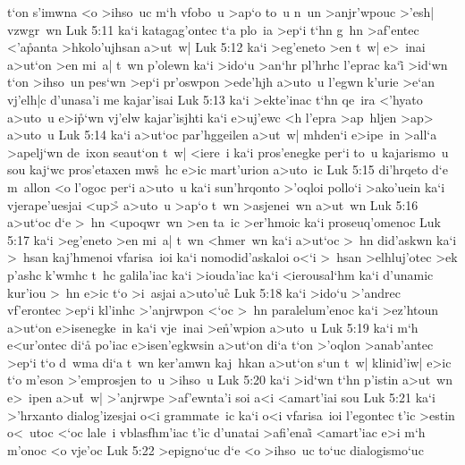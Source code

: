 t`on
s'imwna
<o
>ihso~uc
m`h
vfobo~u
>ap`o
to~u
n~un
>anjr'wpouc
>'esh|
vzwgr~wn\bibvsend
\vs Luk 5:11
ka`i
katagag'ontec
t`a
plo~ia
>ep`i
t`hn
g~hn
>af'entec
<'a\r{p}anta
>hkolo'ujhsan
a>ut~w|\bibvsend
\vs Luk 5:12
ka`i
>eg'eneto
>en
t~w|
e>~inai
a>ut`on
>en
mi~a|
t~wn
p'olewn
ka`i
>ido`u
>an`hr
pl'hrhc
l'eprac
ka`i\r{}
>id`wn
t`on
>ihso~un
pes`wn
>ep`i
pr'oswpon
>ede'hjh
a>uto~u
l'egwn
k'urie
>e`an
vj'elh|c
d'unasa'i
me
kajar'isai\bibvsend
\vs Luk 5:13
ka`i
>ekte'inac
t`hn
qe~ira
<'hyato
a>uto~u
e>i\r{p}`wn
vj'elw
kajar'isjhti
ka`i
e>uj'ewc
<h
l'epra
>ap~hljen
>ap>
a>uto~u\bibvsend
\vs Luk 5:14
ka`i
a>ut`oc
par'hggeilen
a>ut~w|
mhden`i
e>ipe~in
>all`a
>apelj`wn
de~ixon
seaut`on
t~w|
<iere~i
ka`i
pros'enegke
per`i
to~u
kajarismo~u
sou
kaj`wc
pros'etaxen
mw\r{s}~hc
e>ic
mart'urion
a>uto~ic\bibvsend
\vs Luk 5:15
di'hrqeto
d`e
m~allon
<o
l'ogoc
per`i
a>uto~u
ka`i
sun'hrqonto
>'oqloi
pollo`i
>ako'uein
ka`i
vjerape'uesjai
<up>\r{}
a>uto~u
>ap`o
t~wn
>asjenei~wn
a>ut~wn\bibvsend
\vs Luk 5:16
a>ut`oc
d`e
>~hn
<upoqwr~wn
>en
ta~ic
>er'hmoic
ka`i
proseuq'omenoc\bibvsend
\vs Luk 5:17
ka`i
>eg'eneto
>en
mi~a|
t~wn
<hmer~wn
ka`i
a>ut`oc
>~hn
did'askwn
ka`i
>~hsan
kaj'hmenoi
vfarisa~ioi
ka`i
nomodid'askaloi
o<`i
>~hsan
>elhluj'otec
>ek
p'ashc
k'wmhc
t~hc
galila'iac
ka`i
>iouda'iac
ka`i
<ierousal`hm
ka`i
d'unamic
kur'iou
>~hn
e>ic
t`o
>i~asjai
a>uto'u\r{c}\bibvsend
{}
\vs Luk 5:18
ka`i
>ido`u
>'andrec
vf'erontec
>ep`i
kl'inhc
>'anjrwpon
<`oc
>~hn
paralelum'enoc
ka`i
>ez'htoun
a>ut`on
e>isenegke~in
ka`i
vje~inai
>e\r{n}'wpion
a>uto~u\bibvsend
\vs Luk 5:19
ka`i
m`h
e<ur'ontec
di`a\r{}
po'iac
e>isen'egkwsin
a>ut`on
di`a
t`on
>'oqlon
>anab'antec
>ep`i
t`o
d~wma
di`a
t~wn
ker'amwn
kaj~hkan
a>ut`on
s`un
t~w|
klinid'iw|
e>ic
t`o
m'eson
>'emprosjen
to~u
>ihso~u\bibvsend
\vs Luk 5:20
ka`i
>id`wn
t`hn
p'istin
a>ut~wn
e>~ipen
a>u\r{t}~w|
>'anjrwpe
>af'ewnta'i
soi
a<i
<amart'iai
sou\bibvsend
\vs Luk 5:21
ka`i
>'hrxanto
dialog'izesjai
o<i
grammate~ic
ka`i
o<i
vfarisa~ioi
l'egontec
t'ic
>estin
o<~utoc
<`oc
lale~i
vblasfhm'iac
t'ic
d'unatai
>afi'enai\r{}
<amart'iac
e>i
m`h
m'onoc
<o
vje'oc\bibvsend
\vs Luk 5:22
>epigno`uc
d`e
<o
>ihso~uc
to`uc
dialogismo`uc
